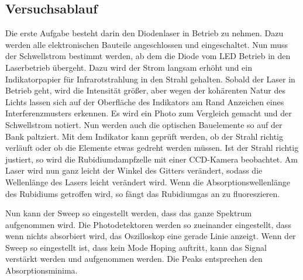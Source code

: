 \subsection{Versuchsablauf}
Die erste Aufgabe besteht darin den Diodenlaser in Betrieb zu nehmen. Dazu werden alle elektronischen Bauteile angeschlossen und eingeschaltet.
Nun muss der Schwellstrom bestimmt werden, ab dem die Diode vom LED Betrieb in den Laserbetrieb übergeht. Dazu wird der Strom langsam erhöht und ein Indikatorpapier 
für Infrarotstrahlung in den Strahl gehalten. Sobald der Laser in Betrieb geht, wird die Intensität größer, aber wegen der kohärenten Natur des Lichts 
lassen sich auf der Oberfläche des Indikators am Rand Anzeichen eines Interferenzmusters erkennen. Es wird ein Photo zum Vergleich gemacht und der Schwellstrom notiert.
Nun werden auch die optischen Bauelemente so auf der Bank paltziert. Mit dem Indikator kann geprüft werden, ob der Strahl richtig verläuft oder 
ob die Elemente etwas gedreht werden müssen. Ist der Strahl richtig justiert, so wird die Rubidiumdampfzelle mit einer CCD-Kamera beobachtet.
Am Laser wird nun ganz leicht der Winkel des Gitters verändert, sodass die Wellenlänge des Lasers leicht verändert wird. Wenn die Absorptionswellenlänge 
des Rubidiums getroffen wird, so fängt das Rubidiumgas an zu fluoreszieren.

\noindent Nun kann der Sweep so eingestellt werden, dass das ganze Spektrum aufgenommen wird. Die Photodetektoren werden so zueinander eingestellt, dass wenn nichts absorbiert wird,
das Oszilloskop eine gerade Linie anzeigt. Wenn der Sweep so eingestellt ist, dass kein Mode Hoping auftritt, kann das Signal verstärkt werden und aufgenommen werden. 
Die Peaks entsprechen den Absorptionsminima.
